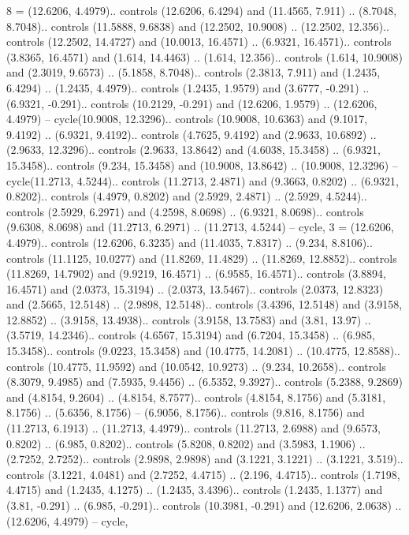 {8} = {(12.6206, 4.4979).. controls (12.6206, 6.4294) and (11.4565, 7.911) .. (8.7048, 8.7048).. controls (11.5888, 9.6838) and (12.2502, 10.9008) .. (12.2502, 12.356).. controls (12.2502, 14.4727) and (10.0013, 16.4571) .. (6.9321, 16.4571).. controls (3.8365, 16.4571) and (1.614, 14.4463) .. (1.614, 12.356).. controls (1.614, 10.9008) and (2.3019, 9.6573) .. (5.1858, 8.7048).. controls (2.3813, 7.911) and (1.2435, 6.4294) .. (1.2435, 4.4979).. controls (1.2435, 1.9579) and (3.6777, -0.291) .. (6.9321, -0.291).. controls (10.2129, -0.291) and (12.6206, 1.9579) .. (12.6206, 4.4979) -- cycle(10.9008, 12.3296).. controls (10.9008, 10.6363) and (9.1017, 9.4192) .. (6.9321, 9.4192).. controls (4.7625, 9.4192) and (2.9633, 10.6892) .. (2.9633, 12.3296).. controls (2.9633, 13.8642) and (4.6038, 15.3458) .. (6.9321, 15.3458).. controls (9.234, 15.3458) and (10.9008, 13.8642) .. (10.9008, 12.3296) -- cycle(11.2713, 4.5244).. controls (11.2713, 2.4871) and (9.3663, 0.8202) .. (6.9321, 0.8202).. controls (4.4979, 0.8202) and (2.5929, 2.4871) .. (2.5929, 4.5244).. controls (2.5929, 6.2971) and (4.2598, 8.0698) .. (6.9321, 8.0698).. controls (9.6308, 8.0698) and (11.2713, 6.2971) .. (11.2713, 4.5244) -- cycle},
{3} = {(12.6206, 4.4979).. controls (12.6206, 6.3235) and (11.4035, 7.8317) .. (9.234, 8.8106).. controls (11.1125, 10.0277) and (11.8269, 11.4829) .. (11.8269, 12.8852).. controls (11.8269, 14.7902) and (9.9219, 16.4571) .. (6.9585, 16.4571).. controls (3.8894, 16.4571) and (2.0373, 15.3194) .. (2.0373, 13.5467).. controls (2.0373, 12.8323) and (2.5665, 12.5148) .. (2.9898, 12.5148).. controls (3.4396, 12.5148) and (3.9158, 12.8852) .. (3.9158, 13.4938).. controls (3.9158, 13.7583) and (3.81, 13.97) .. (3.5719, 14.2346).. controls (4.6567, 15.3194) and (6.7204, 15.3458) .. (6.985, 15.3458).. controls (9.0223, 15.3458) and (10.4775, 14.2081) .. (10.4775, 12.8588).. controls (10.4775, 11.9592) and (10.0542, 10.9273) .. (9.234, 10.2658).. controls (8.3079, 9.4985) and (7.5935, 9.4456) .. (6.5352, 9.3927).. controls (5.2388, 9.2869) and (4.8154, 9.2604) .. (4.8154, 8.7577).. controls (4.8154, 8.1756) and (5.3181, 8.1756) .. (5.6356, 8.1756) -- (6.9056, 8.1756).. controls (9.816, 8.1756) and (11.2713, 6.1913) .. (11.2713, 4.4979).. controls (11.2713, 2.6988) and (9.6573, 0.8202) .. (6.985, 0.8202).. controls (5.8208, 0.8202) and (3.5983, 1.1906) .. (2.7252, 2.7252).. controls (2.9898, 2.9898) and (3.1221, 3.1221) .. (3.1221, 3.519).. controls (3.1221, 4.0481) and (2.7252, 4.4715) .. (2.196, 4.4715).. controls (1.7198, 4.4715) and (1.2435, 4.1275) .. (1.2435, 3.4396).. controls (1.2435, 1.1377) and (3.81, -0.291) .. (6.985, -0.291).. controls (10.3981, -0.291) and (12.6206, 2.0638) .. (12.6206, 4.4979) -- cycle},
